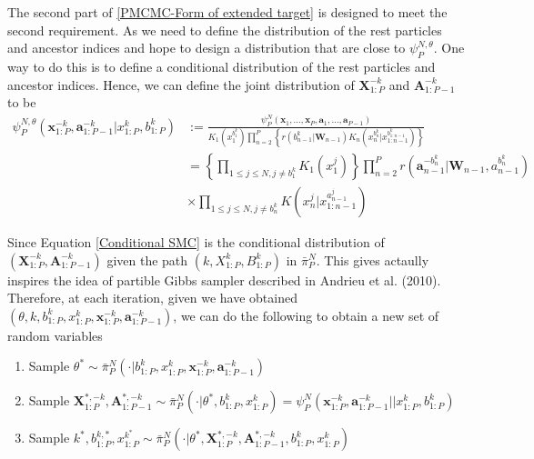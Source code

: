 \documentclass[12pt,a4paper]{article}
\begin{document}
The second part of \eqref{PMCMC-Form of extended target} is designed to meet the second requirement. As we need to define the distribution of the rest particles and ancestor indices and hope to design a distribution that are close to $\psi_P^{N,\theta}$. One way to do this is to define a conditional distribution of the rest particles and ancestor indices. Hence, we can define the joint distribution of $\textbf{X}_{1:P}^{-k}$ and $\textbf{A}_{1:P-1}^{-k}$ to be
\begin{equation}
    \label{Conditional SMC} 
    \begin{split}
        \psi_P^{N,\theta}\left(\textbf{x}_{1:P}^{-k},\textbf{a}_{1:P-1}^{-k}|x_{1:P}^k,b_{1:P}^k\right) &:= \frac{\psi_P^N(\textbf{x}_1,...,\textbf{x}_P,\textbf{a}_1,...,\textbf{a}_{P-1})}{K_1\left(x_1^{b_1^k}\right)\prod_{n=2}^P \left\{r\left(b_{n-1}^k|\textbf{W}_{n-1}\right)K_n\left(x_n^{b_n^k}|x_{1:n-1}^{b_{1:n-1}^k}\right)\right\}}\\
        & = \left\{\prod_{1\leq j \leq N,j \neq b_1^k} K_1\left(x_1^j\right)\right\}\prod_{n=2}^P r\left(\textbf{a}_{n-1}^{-b_{n}^k}|\textbf{W}_{n-1},a_{n-1}^{b_n^k}\right) \\
        & \times \prod_{1 \leq j \leq N, j \neq b_n^k} K\left(x_n^j|x_{1:n-1}^{a_{n-1}^j}\right)
    \end{split}
\end{equation} 


Since Equation \eqref{Conditional SMC} is the conditional distribution of $\left(\textbf{X}_{1:P}^{-k},\textbf{A}_{1:P-1}^{-k}\right)$ given the path $\left(k,X_{1:P}^k,B_{1:P}^k\right)$ in $\bar{\pi}_P^N$. This gives actaully inspires the idea of partible Gibbs sampler described in Andrieu et al. (2010). Therefore, at each iteration, given we have obtained $\left(\theta,k,b_{1:P}^k,x_{1:P}^k,\textbf{x}_{1:P}^{-k},\textbf{a}_{1:P-1}^{-k}\right)$, we can do the following to obtain a new set of random variables

\begin{enumerate}
    \item Sample $\theta^{*} \sim \bar{\pi}_P^N\left(\cdot|b_{1:P}^k,x_{1:P}^k,\textbf{x}_{1:P}^{-k},\textbf{a}_{1:P-1}^{-k}\right)$ 
    \item Sample $\textbf{X}_{1:P}^{*,-k},\textbf{A}_{1:P-1}^{*,-k} \sim \bar{\pi}_P^N\left(\cdot|\theta^{*},b_{1:P}^k,x_{1:P}^k\right)=\psi_P^{N}\left(\textbf{x}_{1:P}^{-k},\textbf{a}_{1:P-1}^{-k}||x_{1:P}^k,b_{1:P}^k\right)$
    \item Sample $k^{*},b_{1:P}^{k,*},x_{1:P}^{k^{*}} \sim \bar{\pi}_P^N\left(\cdot|\theta^{*},\textbf{X}_{1:P}^{*,-k},\textbf{A}_{1:P-1}^{*,-k},b_{1:P}^k,x_{1:P}^k\right)$
\end{enumerate}
\end{document}
